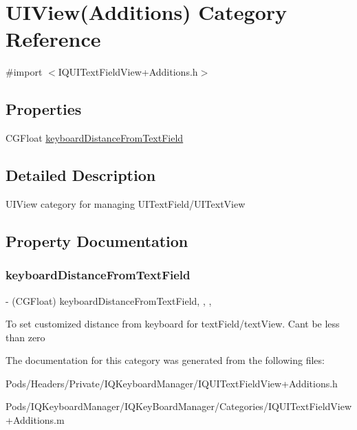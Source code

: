 \hypertarget{category_u_i_view_07_additions_08}{}\section{U\+I\+View(Additions) Category Reference}
\label{category_u_i_view_07_additions_08}


{\ttfamily \#import $<$I\+Q\+U\+I\+Text\+Field\+View+\+Additions.\+h$>$}

\subsection*{Properties}
\begin{DoxyCompactItemize}
\item 
C\+G\+Float \mbox{\hyperlink{category_u_i_view_07_additions_08_a6caf71233cf029a3e3b4813a3c86fc47}{keyboard\+Distance\+From\+Text\+Field}}
\end{DoxyCompactItemize}


\subsection{Detailed Description}
U\+I\+View category for managing U\+I\+Text\+Field/\+U\+I\+Text\+View 

\subsection{Property Documentation}
\mbox{\label{category_u_i_view_07_additions_08_a6caf71233cf029a3e3b4813a3c86fc47}} 
\subsubsection{\texorpdfstring{keyboard\+Distance\+From\+Text\+Field}{keyboardDistanceFromTextField}}
{\footnotesize\ttfamily -\/ (C\+G\+Float) keyboard\+Distance\+From\+Text\+Field\hspace{0.3cm}{\ttfamily [read]}, {\ttfamily [write]}, {\ttfamily [nonatomic]}, {\ttfamily [assign]}}

To set customized distance from keyboard for text\+Field/text\+View. Can\textquotesingle{}t be less than zero 

The documentation for this category was generated from the following files\+:\begin{DoxyCompactItemize}
\item 
Pods/\+Headers/\+Private/\+I\+Q\+Keyboard\+Manager/I\+Q\+U\+I\+Text\+Field\+View+\+Additions.\+h\item 
Pods/\+I\+Q\+Keyboard\+Manager/\+I\+Q\+Key\+Board\+Manager/\+Categories/I\+Q\+U\+I\+Text\+Field\+View+\+Additions.\+m\end{DoxyCompactItemize}
